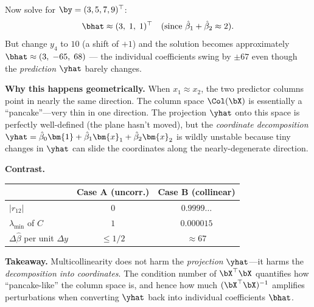 \begin{example}
Now solve for $\by = (3,5,7,9)^\top$:
\[
\bhat \approx (3,\; 1,\; 1)^\top \quad (\text{since } \hat\beta_1+\hat\beta_2\approx 2).
\]
But change $y_4$ to $10$ (a shift of $+1$) and the solution becomes
approximately $\bhat \approx (3,\; -65,\; 68)$ --- the individual coefficients swing by $\pm 67$
even though the \emph{prediction} $\yhat$ barely changes.

\medskip\noindent\textbf{Why this happens geometrically.}
When $x_1\approx x_2$, the two predictor columns point in nearly the same direction.
The column space $\Col(\bX)$ is essentially a ``pancake''---very thin in one direction.
The projection $\yhat$ onto this space is perfectly well-defined (the plane hasn't moved),
but the \emph{coordinate decomposition} $\yhat = \hat\beta_0\bm{1}+\hat\beta_1\bm{x}_1+\hat\beta_2\bm{x}_2$
is wildly unstable because tiny changes in $\yhat$ can slide the coordinates along
the nearly-degenerate direction.

\medskip\noindent\textbf{Contrast.}
\begin{center}
\renewcommand{\arraystretch}{1.2}
\begin{tabular}{lcc}
\toprule
& Case A (uncorr.) & Case B (collinear) \\
\midrule
$|r_{12}|$ & $0$ & $0.9999\ldots$ \\
$\lambda_{\min}$ of $C$ & $1$ & $0.000015$ \\
$\Delta\hat\beta$ per unit $\Delta y$ & $\le 1/2$ & $\approx 67$ \\
\bottomrule
\end{tabular}
\end{center}

\medskip\noindent\textbf{Takeaway.}
Multicollinearity does not harm the \emph{projection} $\yhat$---it harms the
\emph{decomposition into coordinates}.
The condition number of $\bX^\top\bX$ quantifies how ``pancake-like'' the column
space is, and hence how much $(\bX^\top\bX)^{-1}$ amplifies perturbations
when converting $\yhat$ back into individual coefficients $\bhat$.
\end{example}



